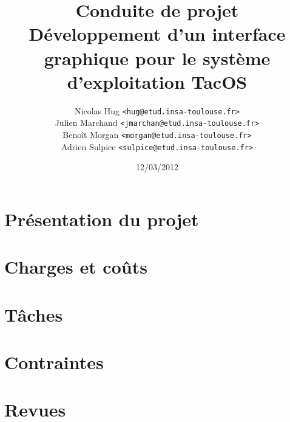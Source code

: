 \documentclass{article}
\title{Conduite de projet \\ Développement d'un interface graphique pour le système d'exploitation TacOS}
\author{Nicolas Hug \texttt{<hug@etud.insa-toulouse.fr>}\\
Julien Marchand \texttt{<jmarchan@etud.insa-toulouse.fr>}\\
Benoît Morgan \texttt{<morgan@etud.insa-toulouse.fr>}\\
Adrien Sulpice \texttt{<sulpice@etud.insa-toulouse.fr>}}
\date{12/03/2012}
\begin{document}
\maketitle

\newpage
\tableofcontents

\newpage


\section{Présentation du projet}

\section{Charges et coûts}

\section{Tâches}

\section{Contraintes}

\section{Revues}

\end{document}
